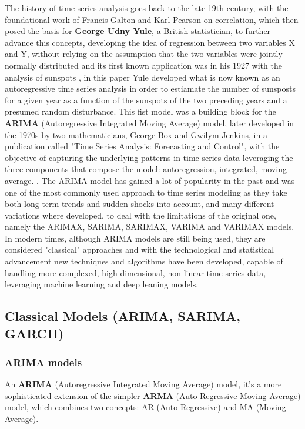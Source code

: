 The history of time series analysis goes back to the late 19th century, with the foundational work of Francis Galton and Karl Pearson on correlation, which then posed the basis for \textbf{George Udny Yule}, a British statistician, to further advance this concepts, developing the idea of regression between two variables X and Y, without relying on the assumption that the two variables were jointly normally distributed \cite{l_kristensen_foundations_2021} and its first known application was in his 1927 with the analysis of sunspots \cite{SILVERMAN198899}, in this paper Yule developed what is now known as an autoregressive time series analysis in order to estiamate the number of sunsposts for a given year as a function of the sunspots of the two preceding years and a presumed random disturbance. This fist model was a building block for the \textbf{ARIMA} (Autoregressive Integrated Moving Average) model, later developed in the 1970s by two mathematicians, George Box and Gwilym Jenkins, in a publication called "Time Series Analysis: Forecasting and Control", with the objective of capturing the underlying patterns in time series data leveraging the three components that compose the model: autoregression, integrated, moving average. \cite{article_2}. The ARIMA model has gained a lot of popularity in the past and was one of the most commonly used approach to time series modeling as they take both long-term trends and sudden shocks into account, and many different variations where developed, to deal with the limitations of the original one, namely the ARIMAX, SARIMA, SARIMAX, VARIMA and VARIMAX models. In modern times, although ARIMA models are still being used, they are considered "classical" approaches and with the technological and statistical advancement new techniques and algorithms have been developed, capable of handling more complexed, high-dimensional, non linear time series data, leveraging machine learning and deep leaning models.


\subsection{Classical Models (ARIMA, SARIMA, GARCH)} %
\subsubsection{ARIMA models}
An \textbf{ARIMA} (Autoregressive Integrated Moving Average) model, it's a more sophisticated extension of the simpler \textbf{ARMA} (Auto Regressive Moving Average) model, which combines two concepts: AR (Auto Regressive) and MA (Moving Average). 

